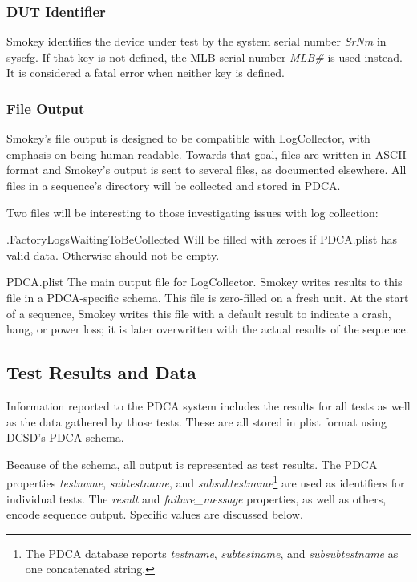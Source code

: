 \documentclass[11pt]{article}
\newcommand{\prop}[1]{{\itshape#1}}
\newcommand{\nvram}[1]{\mbox{\itshape#1}}
\begin{document}
\subsubsection{DUT Identifier}

Smokey identifies the device under test by the system serial number \nvram{SrNm} in
syscfg.  If that key is not defined, the MLB serial number \nvram{MLB\#} is used
instead.  It is considered a fatal error when neither key is defined.

\subsubsection{File Output}

Smokey's file output is designed to be compatible with LogCollector, with
emphasis on being human readable.  Towards that goal, files are written in
ASCII format and Smokey's output is sent to several files, as documented
elsewhere.  All files in a sequence's directory will be collected and stored in
PDCA.

Two files will be interesting to those investigating issues with log
collection:

\begin{Definition}

\item[.FactoryLogsWaitingToBeCollected] Will be filled with zeroes if
	PDCA.plist has valid data.  Otherwise should not be empty.

\item[PDCA.plist] The main output file for LogCollector.  Smokey writes
	results to this file in a PDCA-specific schema.  This file is
	zero-filled on a fresh unit.  At the start of a sequence, Smokey
	writes this file with a default result to indicate a crash, hang, or
	power loss; it is later overwritten with the actual results of the
	sequence.

\end{Definition}

\subsection{Test Results and Data}

Information reported to the PDCA system includes the results for all tests as
well as the data gathered by those tests.  These are all stored in plist format
using DCSD's PDCA schema.

Because of the schema, all output is represented as test results.  The PDCA
properties \prop{testname}, \prop{subtestname}, and \prop{subsubtestname}\footnote{The PDCA
database reports \prop{testname}, \prop{subtestname}, and \prop{subsubtestname} as one concatenated
string.} are used as identifiers for individual tests.  The \prop{result} and
\prop{failure\_message} properties, as well as others, encode sequence output.
Specific values are discussed below.
\end{document}
